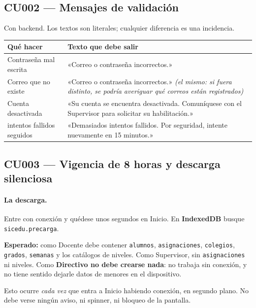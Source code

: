 \documentclass[11pt,a4paper]{article}
\begin{document}
\subsection{CU002 --- Mensajes de validación}

Con backend. Los textos son literales; cualquier diferencia es una incidencia.

\begin{center}
\begin{tabularx}{\textwidth}{lX}
\toprule
\textbf{Qué hacer} & \textbf{Texto que debe salir} \\
\midrule
Contraseña mal escrita & «Correo o contraseña incorrectos.» \\
\addlinespace
Correo que no existe & «Correo o contraseña incorrectos.» \emph{(el mismo: si fuera distinto, se podría averiguar qué correos están registrados)} \\
\addlinespace
Cuenta desactivada & «Su cuenta se encuentra desactivada. Comuníquese con el Supervisor para solicitar su habilitación.» \\
\addlinespace
5 intentos fallidos seguidos & «Demasiados intentos fallidos. Por seguridad, intente nuevamente en 15 minutos.» \\
\bottomrule
\end{tabularx}
\end{center}

\subsection{CU003 --- Vigencia de 8 horas y descarga silenciosa}

\paragraph{La descarga.} Entre con conexión y quédese unos segundos en Inicio.
En \textbf{IndexedDB} busque \texttt{sicedu.precarga}.

\textbf{Esperado:} como Docente debe contener \texttt{alumnos},
\texttt{asignaciones}, \texttt{colegios}, \texttt{grados}, \texttt{semanas} y
los catálogos de niveles. Como Supervisor, sin \texttt{asignaciones} ni niveles.
Como \textbf{Directivo no debe crearse nada}: no trabaja sin conexión, y no
tiene sentido dejarle datos de menores en el dispositivo.

Esto ocurre \emph{cada vez} que entra a Inicio habiendo conexión, en segundo
plano. No debe verse ningún aviso, ni spinner, ni bloqueo de la pantalla.
\end{document}

